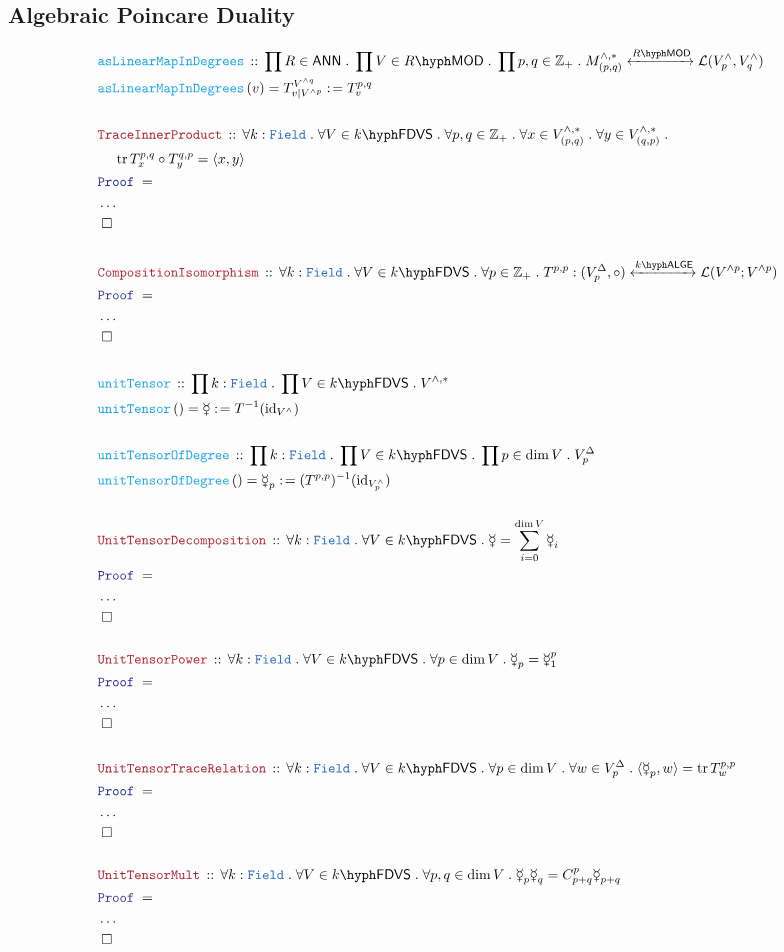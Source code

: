 \documentclass[12pt]{scrartcl}%
\newcommand{\TYPE}[1]{\textcolor{NavyBlue}{\mathtt{#1}}}%
\newcommand{\FUNC}[1]{\textcolor{Cerulean}{\mathtt{#1}}}%
\newcommand{\LOGIC}[1]{\textcolor{Blue}{\mathtt{#1}}}%
\newcommand{\THM}[1]{\textcolor{Maroon}{\mathtt{#1}}}%
\renewcommand{\.}{\; . \;} %
\newcommand{\de}{: \kern 0.1pc =} %
\newcommand{\Act}[1]{\left( #1 \right)} %
\newcommand{\Theorem}[2]{& \THM{#1} \, :: \, #2 \\ & \Proof = \\ } %
\newcommand{\DeclareFunc}[2]{& \FUNC{#1} \, :: \, #2 \\}%
\newcommand{\DefineNamedFunc}[4]{&  \FUNC{#1}\Act{#2} = #3 \de #4 \\}%
\newcommand{\NewLine}{\\ & \kern 1pc}%
\newcommand{\Page}[1]{ \begin{align*} #1 \end{align*}  }%
\newcommand{\NoProof}{ & \ldots \\ \EndProof}%
\newcommand{\Int}{\mathbb{Z}}%
\DeclareMathOperator*{\id}{id}%
\newcommand{\QED}{\; \square} %
\newcommand{\EndProof}{& \QED \\} %
\newcommand{\Proof}{\LOGIC{Proof} \; } %
\newcommand{\ToIso}[1]{\xleftrightarrow{#1}}%
\DeclareMathOperator{\tr}{tr}     %
\newcommand{\FDVS}[1]{#1\hyph\mathsf{FDVS}} %
\newcommand{\LMOD}[1]{#1\hyph\mathsf{MOD}} %
\renewcommand{\L}{\mathcal{L}}
\newcommand{\Field}{\TYPE{Field}}
\newcommand{\ANN}{\mathsf{ANN}} %
\newcommand{\LALGE}[1]{#1\hyph\mathsf{ALGE}}%
\begin{document}
\subsection{Algebraic Poincare Duality}
\Page{
	\DeclareFunc{asLinearMapInDegrees}{ \prod R \in \ANN \. \prod V \in \LMOD{R} \. \prod p,q \in \Int_+ \. M^{\wedge,*}_{(p,q)} \ToIso{\LMOD{R}} \L(V^\wedge_p,V^\wedge_q) }
	\DefineNamedFunc{asLinearMapInDegrees}{ v}{T_{v|V^{\wedge p}}^{V^{\wedge q}}}{T^{p,q}_v} 
	\\
	\Theorem{TraceInnerProduct}
	{
		\forall k :  \Field \.
		\forall V \in \FDVS{k} \.
		\forall p,q \in \Int_+ \.
		\forall x \in V^{\wedge,*}_{(p,q)} \.
		\forall y \in V^{\wedge,*}_{(q,p)} \. \NewLine
		\tr T_x^{p,q} \circ T_y^{q,p}  = \langle x,y \rangle  
	}
	\NoProof
	\\
	\Theorem{CompositionIsomorphism}
	{
		\forall k : \Field \.
		\forall V \in \FDVS{k} \.
		\forall p \in \Int_+ \.
		T^{p,p} : (V^\Delta_p,\circ) \ToIso{\LALGE{k}} \L(V^{\wedge p}; V^{\wedge p})
	}
	\NoProof
	\\
	\DeclareFunc{unitTensor}{ \prod k : \Field \. \prod V \in \FDVS{k}  \. V^{\wedge,*}   }
	\DefineNamedFunc{unitTensor}{}{\mercury}{T^{-1}({\id}_{V^\wedge})}
	\\
	\DeclareFunc{unitTensorOfDegree}{ \prod k : \Field \. \prod V \in \FDVS{k}  \. \prod p \in \dim V \. V^\Delta_{p}   }
	\DefineNamedFunc{unitTensorOfDegree}{}{\mercury_p}{(T^{p,p})^{-1}({\id}_{V^\wedge_p})}
	\\
	\Theorem{UnitTensorDecomposition}{ \forall k : \Field \.  \forall V \in \FDVS{k} \. \mercury  = \sum^{\dim V}_{i = 0} \mercury_i  }
	\NoProof
	\\
	\Theorem{UnitTensorPower}{\forall k : \Field \. \forall V \in \FDVS{k} \. \forall p \in \dim V \.  \mercury_p = \mercury_1^p}
	\NoProof
	\\
	\Theorem{UnitTensorTraceRelation}{
		\forall k : \Field \. 
		\forall V \in \FDVS{k} \. 
		\forall p \in \dim V \. 
		\forall w \in V^\Delta_p \.
		\langle \mercury_p, w \rangle = \tr T_w^{p,p} 
	}
	\NoProof
	\\
	\Theorem{UnitTensorMult}{
		\forall k : \Field \. 
		\forall V \in \FDVS{k} \. 
		\forall p,q \in \dim V \. 
		\mercury_p \mercury_q = C_{p+q}^p \mercury_{p+q}
	}
	\NoProof 	
}
\end{document}
